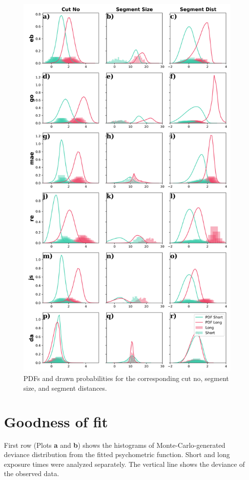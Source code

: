 \documentclass{article}
\begin{document}
\begin{figure}
    \centering
    \includegraphics[width = \linewidth]{Thesis/plots/marginalDensities.png}
    \caption{PDFs and drawn probabilities for the corresponding cut no, segment size, and segment distances.}
    \label{fig:mpd}
\end{figure}
\clearpage

\section{Goodness of fit}
\label{appendix:gof}
First row (Plots \textbf{a} and \textbf{b}) shows the histograms of Monte-Carlo-generated deviance distribution from the fitted psychometric function. Short and long exposure times were analyzed separately. The vertical line shows the deviance of the observed data.
\end{document}
